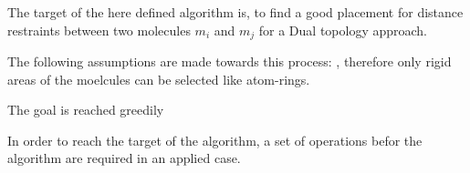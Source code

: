
The target of the here defined algorithm is, to find a good placement for distance restraints between two molecules $m_i$ and $m_j$ for a Dual topology approach.

The following assumptions are made towards this process:
, therefore only rigid areas of the moelcules can be selected like atom-rings.

The goal is reached greedily 

In order to reach the target of the algorithm, a set of operations befor the algorithm are required in an applied case. 

